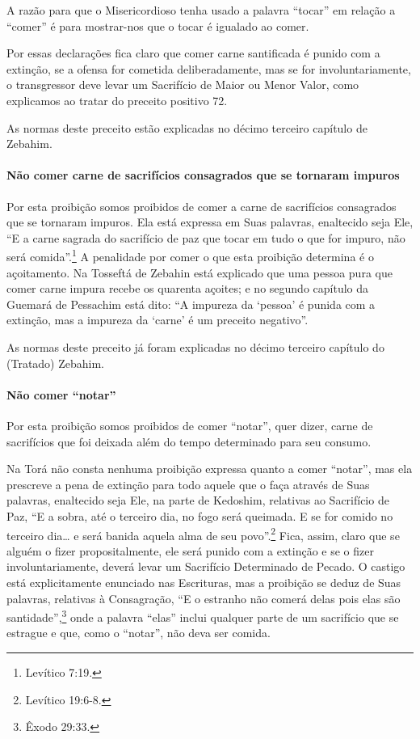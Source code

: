 A razão para que o Misericordioso tenha usado a palavra ``tocar'' em
relação a ``comer'' é para mostrar-nos que o tocar é igualado ao comer.

Por essas declarações fica claro que comer carne santificada é punido
com a extinção, se a ofensa for cometida deliberadamente, mas se for
involuntariamente, o transgressor deve levar um Sacrifício de Maior ou
Menor Valor, como explicamos ao tratar do preceito positivo 72.

As normas deste preceito estão explicadas no décimo terceiro capítulo
de Zebahim.

\paragraph{Não comer carne de sacrifícios consagrados que se tornaram impuros}

Por esta proibição somos proibidos de comer a carne de sacrifícios
consagrados que se tornaram impuros. Ela está expressa em Suas palavras,
enaltecido seja Ele, ``E a carne sagrada do sacrifício de paz que tocar
em tudo o que for impuro, não será comida''.\footnote{Levítico 7:19.} A
penalidade por comer o que esta proibição determina é o açoitamento. Na
Tosseftá de Zebahin está explicado que uma pessoa pura que comer carne
impura recebe os quarenta açoites; e no segundo capítulo da Guemará de Pessachim está dito: ``A
impureza da `pessoa' é punida com a extinção, mas a impureza da `carne'
é um preceito negativo''.

As normas deste preceito já foram explicadas no décimo terceiro capítulo
do (Tratado) Zebahim.

\paragraph{Não comer ``notar''}

Por esta proibição somos proibidos de comer ``notar'', quer dizer, carne
de sacrifícios que foi deixada além do tempo determinado para seu
consumo.

Na Torá não consta nenhuma proibição expressa quanto a comer ``notar'',
mas ela prescreve a pena de extinção para todo aquele que o faça
através de Suas palavras, enaltecido seja Ele, na parte de Kedoshim,
relativas ao Sacrifício de Paz, ``E a sobra, até o terceiro dia, no fogo
será queimada. E se for comido no terceiro dia\ldots{} e será banida aquela
alma de seu povo''.\footnote{Levítico 19:6-8.} Fica, assim, claro que se alguém o
fizer propositalmente, ele será punido com a extinção e se o fizer
involuntariamente, deverá levar um Sacrifício Determinado de Pecado. O
castigo está explicitamente enunciado nas Escrituras, mas a proibição
se deduz de Suas palavras, relativas à Consagração, ``E o estranho não
comerá delas pois elas são santidade'',\footnote{Êxodo 29:33.} onde a palavra
``elas'' inclui qualquer parte de um sacrifício que se estrague e que,
como o ``notar'', não deva ser comida.

